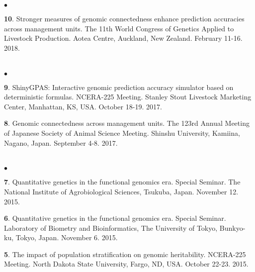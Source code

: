 \documentclass[margin,line,10pt]{res}
\newenvironment{list2}{
  \begin{list}{$\bullet$}{%
      \setlength{\itemsep}{0in}
      \setlength{\parsep}{0in} \setlength{\parskip}{0in}
      \setlength{\topsep}{0in} \setlength{\partopsep}{0in} 
      \setlength{\leftmargin}{0.2in}}}{\end{list}}
\begin{document}
\begin{resume}
\begin{list2}
          
\item [{\bf 10}.] Stronger measures of genomic connectedness enhance prediction accuracies across management units. The 11th World Congress of Genetics Applied to Livestock Production.  Aotea Centre, Auckland, New Zealand. February 11-16. 2018.

\end{list2}  





\section{}
\begin{list2}

  \item [{\bf 9}.] ShinyGPAS: Interactive genomic prediction accuracy simulator based on deterministic formulas. NCERA-225 Meeting. Stanley Stout Livestock Marketing Center, Manhattan, KS, USA. October 18-19. 2017.

      \vspace{0.5cm}

  \item [{\bf 8}.] Genomic connectedness across management units. The 123rd Annual Meeting of Japanese Society of Animal Science Meeting. Shinshu University, Kamiina, Nagano, Japan. September 4-8. 2017.

\end{list2}  

    
\section{}
\begin{list2}

  \item [{\bf 7}.] Quantitative genetics in the functional genomics era. Special Seminar. The National Institute of Agrobiological Sciences, Tsukuba, Japan. November 12. 2015.

  \vspace{0.5cm}

\item [{\bf 6}.] Quantitative genetics in the functional genomics era. Special Seminar. Laboratory of Biometry and Bioinformatics, The University of Tokyo, Bunkyo-ku, Tokyo, Japan. November 6. 2015.

  \vspace{0.5cm}
  
\item [{\bf 5}.] The impact of population stratification on genomic heritability. NCERA-225 Meeting. North Dakota State University, Fargo, ND, USA. October 22-23. 2015.


\end{list2}
\end{resume}
\end{document}
